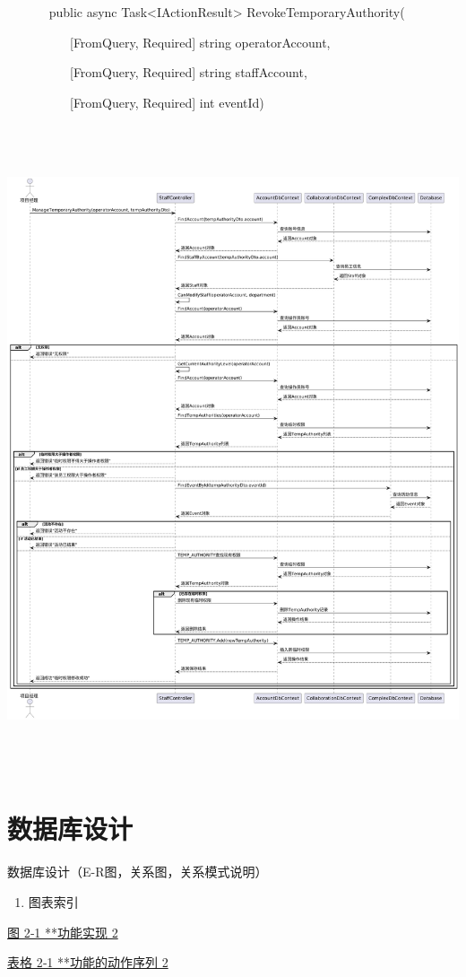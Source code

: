 \documentclass[]{article}
\begin{document}
~ ~ ~ ~ public async Task\textless{}IActionResult\textgreater{}
RevokeTemporaryAuthority(

~ ~ ~ ~ ~ ~ {[}FromQuery, Required{]} string operatorAccount,

~ ~ ~ ~ ~ ~ {[}FromQuery, Required{]} string staffAccount,

~ ~ ~ ~ ~ ~ {[}FromQuery, Required{]} int eventId)

\includegraphics[width=6.28194in,height=7.52361in]{media/media/image19.png}

\hypertarget{ux6570ux636eux5e93ux8bbeux8ba1}{%
\section{数据库设计}\label{ux6570ux636eux5e93ux8bbeux8ba1}}

数据库设计（E-R图，关系图，关系模式说明）

\begin{enumerate}
\def\labelenumi{\Alph{enumi}.}
\item
  \protect\hypertarget{_Toc153177886}{}{\protect\hypertarget{_Toc153186299}{}{\protect\hypertarget{_Toc155321769}{}{\protect\hypertarget{_Toc77076522}{}{}}}}图表索引
\end{enumerate}

\protect\hyperlink{_Toc394245023}{{图 2‑1 **功能实现} 2}

\protect\hyperlink{_Toc394245026}{{表格 2‑1 **功能的动作序列} 2}
\end{document}

